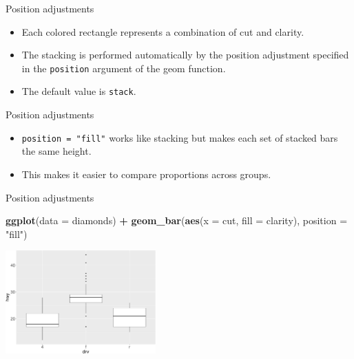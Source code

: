 \documentclass[ignorenonframetext,]{beamer}
\newenvironment{Shaded}{\begin{snugshade}}{\end{snugshade}}
\newcommand{\DataTypeTok}[1]{\textcolor[rgb]{0.13,0.29,0.53}{#1}}
\newcommand{\KeywordTok}[1]{\textcolor[rgb]{0.13,0.29,0.53}{\textbf{#1}}}
\newcommand{\NormalTok}[1]{#1}
\newcommand{\OperatorTok}[1]{\textcolor[rgb]{0.81,0.36,0.00}{\textbf{#1}}}
\newcommand{\StringTok}[1]{\textcolor[rgb]{0.31,0.60,0.02}{#1}}
\begin{document}
\begin{frame}[fragile]{Position adjustments}
\protect\hypertarget{position-adjustments}{}

\begin{itemize}
\item
  Each colored rectangle represents a combination of cut and clarity.
\item
  The stacking is performed automatically by the position adjustment
  specified in the \texttt{position} argument of the geom function.
\item
  The default value is \texttt{stack}.
\end{itemize}

\end{frame}

\begin{frame}[fragile]{Position adjustments}
\protect\hypertarget{position-adjustments-1}{}

\begin{itemize}
\item
  \texttt{position\ =\ "fill"} works like stacking but makes each set of
  stacked bars the same height.
\item
  This makes it easier to compare proportions across groups.
\end{itemize}

\end{frame}

\begin{frame}[fragile]{Position adjustments}
\protect\hypertarget{position-adjustments-2}{}

\begin{Shaded}
\begin{Highlighting}[]
\KeywordTok{ggplot}\NormalTok{(}\DataTypeTok{data =}\NormalTok{ diamonds) }\OperatorTok{+}\StringTok{ }
\StringTok{  }\KeywordTok{geom_bar}\NormalTok{(}\KeywordTok{aes}\NormalTok{(}\DataTypeTok{x =}\NormalTok{ cut, }\DataTypeTok{fill =}\NormalTok{ clarity), }
           \DataTypeTok{position =} \StringTok{"fill"}\NormalTok{)}
\end{Highlighting}
\end{Shaded}

\begin{center}\includegraphics[height=150px]{data-visualization_files/figure-beamer/unnamed-chunk-137-1} \end{center}

\end{frame}
\end{document}
